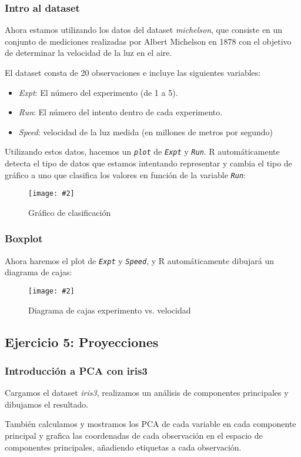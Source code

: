 \documentclass[
12pt, 
spanish, 
singlespacing,
headsepline
]{article}
\newcommand{\smallimage}[2]{
\begin{figure}[H]
	\caption{#1}
	\centering
	\texttt{[image: \#2]}
\end{figure}
}
\newcommand{\code}[1]{\textit{\texttt{#1}}}
\begin{document}
\subsubsection{Intro al dataset}
Ahora estamos utilizando los datos del dataset \emph{michelson}, que consiste en un conjunto de mediciones realizadas por Albert Michelson en 1878 con el objetivo de determinar la velocidad de la luz en el aire.

El dataset consta de 20 observaciones e incluye las siguientes variables:
\begin{itemize}
\item \emph{Expt}: El número del experimento (de 1 a 5).
\item \emph{Run}: El número del intento dentro de cada experimento.
\item \emph{Speed}: velocidad de la luz medida (en millones de metros por segundo)
\end{itemize}    

Utilizando estos datos, hacemos un \code{plot} de \code{Expt} y \code{Run}. R automáticamente detecta el tipo de datos que estamos intentando representar y cambia el tipo de gráfico a uno que clasifica los valores en función de la variable \code{Run}:

\smallimage{Gráfico de clasificación}{R/heat.png}

\subsubsection{Boxplot}
Ahora haremos el plot de \code{Expt} y \code{Speed}, y R automáticamente dibujará un diagrama de cajas:

\smallimage{Diagrama de cajas experimento vs. velocidad}{R/boxplot.png}

\subsection{Ejercicio 5: Proyecciones}
\subsubsection{Introducción a PCA con iris3}
Cargamos el dataset \emph{iris3}, realizamos un análisis de componentes principales y dibujamos el resultado. 

También calculamos y mostramos los PCA de cada variable en cada componente principal y grafica las coordenadas de cada observación en el espacio de componentes principales, añadiendo etiquetas a cada observación.
\end{document}
